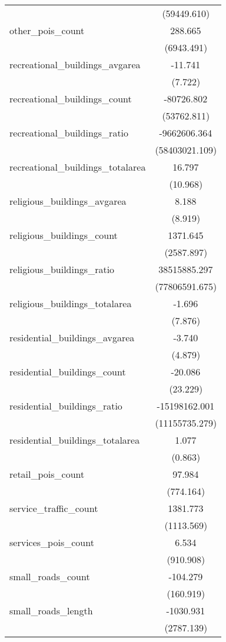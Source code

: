 \begin{table}[!htbp]
\begin{tabular}{@{\extracolsep{5pt}}lc}
  & (59449.610) \\
 other_pois_count & 288.665$^{}$ \\
  & (6943.491) \\
 recreational_buildings_avgarea & -11.741$^{}$ \\
  & (7.722) \\
 recreational_buildings_count & -80726.802$^{}$ \\
  & (53762.811) \\
 recreational_buildings_ratio & -9662606.364$^{}$ \\
  & (58403021.109) \\
 recreational_buildings_totalarea & 16.797$^{}$ \\
  & (10.968) \\
 religious_buildings_avgarea & 8.188$^{}$ \\
  & (8.919) \\
 religious_buildings_count & 1371.645$^{}$ \\
  & (2587.897) \\
 religious_buildings_ratio & 38515885.297$^{}$ \\
  & (77806591.675) \\
 religious_buildings_totalarea & -1.696$^{}$ \\
  & (7.876) \\
 residential_buildings_avgarea & -3.740$^{}$ \\
  & (4.879) \\
 residential_buildings_count & -20.086$^{}$ \\
  & (23.229) \\
 residential_buildings_ratio & -15198162.001$^{}$ \\
  & (11155735.279) \\
 residential_buildings_totalarea & 1.077$^{}$ \\
  & (0.863) \\
 retail_pois_count & 97.984$^{}$ \\
  & (774.164) \\
 service_traffic_count & 1381.773$^{}$ \\
  & (1113.569) \\
 services_pois_count & 6.534$^{}$ \\
  & (910.908) \\
 small_roads_count & -104.279$^{}$ \\
  & (160.919) \\
 small_roads_length & -1030.931$^{}$ \\
  & (2787.139) \\

\end{tabular}
\end{table}
